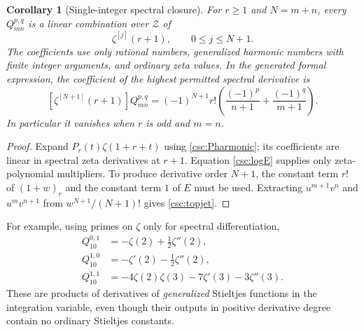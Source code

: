 \documentclass[11pt,a4paper]{article}
\numberwithin{equation}{section}
\newtheorem{corollary}[theorem]{Corollary}
\theoremstyle{definition}
\begin{document}
\begin{corollary}[Single-integer spectral closure]\label{csc:jetclosure}
For $r\ge1$ and $N=m+n$, every $Q_{mn}^{p,q}$ is a linear combination over $\mathcal Z$ of
\[
\zeta^{[j]}(r+1),\qquad 0\le j\le N+1.
\]
The coefficients use only rational numbers, generalized harmonic numbers with finite integer arguments, and ordinary zeta values. In the generated formal expression, the coefficient of the highest permitted spectral derivative is
\begin{equation}\label{csc:topjet}
[\zeta^{[N+1]}(r+1)]Q_{mn}^{p,q}
=(-1)^{N+1}r!\left(\frac{(-1)^p}{n+1}+\frac{(-1)^q}{m+1}\right).
\end{equation}
In particular it vanishes when $r$ is odd and $m=n$.
\end{corollary}
\begin{proof}
Expand $P_r(t)\zeta(1+r+t)$ using \eqref{csc:Pharmonic}; its coefficients are linear in spectral zeta derivatives at $r+1$. Equation \eqref{csc:logE} supplies only zeta-polynomial multipliers. To produce derivative order $N+1$, the constant term $r!$ of $(1+w)_r$ and the constant term $1$ of $E$ must be used. Extracting $u^{m+1}v^n$ and $u^mv^{n+1}$ from $w^{N+1}/(N+1)!$ gives \eqref{csc:topjet}.
\end{proof}
For example, using primes on $\zeta$ only for spectral differentiation,
\begin{align}
Q_{10}^{0,1}&=-\zeta(2)+\frac12\zeta''(2),\label{csc:mixed1}\\
Q_{10}^{1,0}&=-\zeta'(2)-\frac12\zeta''(2),\label{csc:mixed2}\\
Q_{10}^{1,1}&=-4\zeta(2)\zeta(3)-7\zeta'(3)-3\zeta''(3).\label{csc:mixed3}
\end{align}
These are products of derivatives of \emph{generalized} Stieltjes functions in the integration variable, even though their outputs in positive derivative degree contain no ordinary Stieltjes constants.
\end{document}
